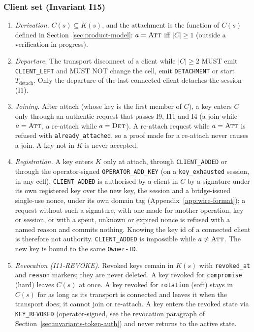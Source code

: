 \subsubsection{Client set (Invariant I15)}
\label{sec:invariants-client-set}

\begin{invariant}\label{inv:I15}
\begin{enumerate}[leftmargin=2em,label=(\alph*)]
\item \emph{Derivation.} $C(s) \subseteq K(s)$, and the attachment is
the function of $C(s)$ defined in Section~\ref{sec:product-model}:
$a=\textsc{Att}$ iff $|C|\geq 1$ (outside a verification in progress).
\item \emph{Departure.} The transport disconnect of a client while
$|C| \geq 2$ MUST emit \texttt{CLIENT\_LEFT} and MUST NOT change the cell,
emit \texttt{DETACHMENT} or start $T_{\text{detach}}$. Only the
departure of the last connected client detaches the session (I1).
\item \emph{Joining.} After attach (whose key is the first member of $C$), a key enters $C$ only through an authentic request
that passes I9, I11 and I4 (a join while $a=\textsc{Att}$, a re-attach
while $a=\textsc{Det}$). A re-attach request while $a=\textsc{Att}$ is
refused with \texttt{already\_attached}, so a proof made for a re-attach
never causes a join. A key not in $K$ is never accepted.
\item \emph{Registration.} A key enters $K$ only at attach, through
\texttt{CLIENT\_ADDED} or through the operator-signed
\texttt{OPERATOR\_ADD\_KEY} (on a \texttt{key\_exhausted} session, in any
cell). \texttt{CLIENT\_ADDED} is authorised by a client in $C$ by a signature
under its own registered key over the new key, the session and a
bridge-issued single-use nonce, under its own domain tag (Appendix~\ref{app:wire-format});
a request without such a signature, with one made for another operation,
key or session, or with a spent, unknown or expired nonce is refused with
a named reason and commits nothing. Knowing the key id of a connected
client is therefore not authority. \texttt{CLIENT\_ADDED} is impossible while
$a \neq \textsc{Att}$. The new key is bound to the same
\texttt{Owner-ID}.
\item \emph{Revocation (I11-REVOKE).} Revoked keys remain in $K(s)$
with \texttt{revoked\_at} and \texttt{reason} markers; they are
never deleted. A key revoked for \texttt{compromise} (hard) leaves
$C(s)$ at once. A key revoked for \texttt{rotation} (soft) stays in
$C(s)$ for as long as its transport is connected and leaves it when the
transport does; it cannot join or re-attach. A key enters the revoked
state via \texttt{KEY\_REVOKED} (operator-signed, see the
revocation paragraph of Section~\ref{sec:invariants-token-auth}) and
never returns to the active state.
\end{enumerate}
\end{invariant}

